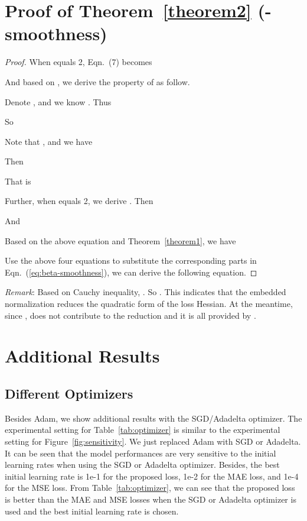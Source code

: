 \documentclass[sigconf]{acmart}
\begin{document}
\section{Proof of Theorem~\ref{theorem2} (-smoothness)}
\label{sec:supp_d}
\begin{proof}
When  equals 2, Eqn.~(7) becomes


And based on , we derive the property of  as follow.


Denote , and we know . Thus





So

 
 Note that , and we have 
 


Then


That is


Further, when  equals 2, we derive . Then




And


Based on the above equation and Theorem~\ref{theorem1}, we have


Use the above four equations to substitute the corresponding parts in Eqn.~(\ref{eq:beta-smoothness}), we can derive the following equation.


\end{proof}

\textit{Remark}: Based on Cauchy inequality, . So . 
This indicates that the embedded normalization reduces the quadratic form of the loss Hessian. 
At the meantime, since ,  does not contribute to the reduction and it is all provided by .

\section{Additional Results}

\subsection{Different Optimizers}
Besides Adam, we show additional results with the SGD/Adadelta optimizer.
The experimental setting for Table~\ref{tab:optimizer} is similar to the experimental setting for Figure~\ref{fig:sensitivity}. We just replaced Adam with SGD or Adadelta. It can be seen that the model performances are very sensitive to the initial learning rates when using the SGD or Adadelta optimizer. Besides, the best initial learning rate is 1e-1 for the proposed loss, 1e-2 for the MAE loss, and 1e-4 for the MSE loss.
From Table~\ref{tab:optimizer}, we can see that the proposed loss is better than the MAE and MSE losses when the SGD or Adadelta optimizer is used and the best initial learning rate is chosen. 
\end{document}
